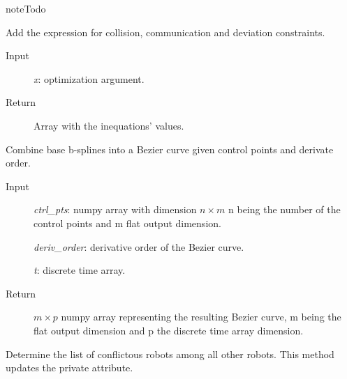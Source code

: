 \documentclass[letterpaper,10pt,english]{sphinxmanual}
\begin{document}
\begin{fulllineitems}
\begin{fulllineitems}
\begin{description}
\end{description}

\begin{notice}{note}{Todo}

Add the expression for collision, communication and deviation constraints.
\end{notice}
\begin{description}
\item[{Input}] \leavevmode
\emph{x}: optimization argument.

\item[{Return}] \leavevmode
Array with the inequations' values.

\end{description}

\end{fulllineitems}


\begin{fulllineitems}
\label{Multi-robot motion planner:planning_sim.Robot._comb_bsp}
Combine base b-splines into a Bezier curve given control points and derivate order.
\begin{description}
\item[{Input}] \leavevmode
\emph{ctrl\_pts}: numpy array with dimension \(n\times m\) n being the number of
the control points and m flat output dimension.

\emph{deriv\_order}: derivative order of the Bezier curve.

\emph{t}: discrete time array.

\item[{Return}] \leavevmode
\(m\times p\) numpy array representing the resulting Bezier curve, m being
the flat output dimension and p the discrete time array dimension.

\end{description}

\end{fulllineitems}


\begin{fulllineitems}
\label{Multi-robot motion planner:planning_sim.Robot._compute_conflicts}
Determine the list of conflictous robots among all other robots.
This method updates the  private attribute.


\end{fulllineitems}
\end{fulllineitems}
\end{document}
